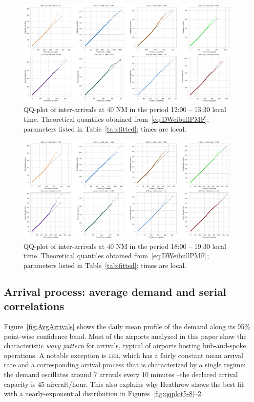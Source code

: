 \documentclass[draft,review]{elsarticle}
\newcommand{\airp}[1]{\textcolor{#1}{\textsc{#1}}}
\begin{document}
\begin{figure}
    \includegraphics[width=\textwidth]{IA_qqplot1200-1330}
    \caption{QQ-plot of inter-arrivals at 40 NM in the period 12:00 -- 13:30 local time. Theoretical quantiles obtained from~\eqref{eq:DWeibullPMF}; parameters listed in Table~\ref{tab:fitted}; times are local.}
    \label{fig:qqplot5-11}
\end{figure}

\begin{figure}
    \includegraphics[width=\textwidth]{IA_qqplot1800-1930}
    \caption{QQ-plot of inter-arrivals at 40 NM in the period 18:00 -- 19:30 local time. Theoretical quantiles obtained from~\eqref{eq:DWeibullPMF}; parameters listed in Table~\ref{tab:fitted}; times are local.}
    \label{fig:qqplot5-17}
\end{figure}

\subsection{Arrival process: average demand and serial correlations}
\label{sec:serial_corr}

Figure~\ref{fig:AvgArrivals} shows the daily mean profile of the demand along its 95\% point-wise confidence band.
Most of the airports analyzed in this paper show the characteristic \emph{wavy pattern} for arrivals, typical of airports hosting hub-and-spoke operations.
A notable exception is \airp{lhr}, which has a fairly constant mean arrival rate and a corresponding arrival process that is characterized by a single regime: the demand oscillates around 7 arrivals every 10 minutes --the declared arrival capacity is 45 aircraft/hour.
This also explains why Heathrow shows the best fit with a nearly-exponential distribution in Figures~\ref{fig:qqplot5-8}--\ref{fig:qqplot5-17}.
\end{document}
